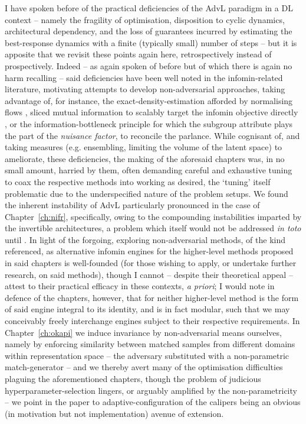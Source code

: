 %
I have spoken before of the practical deficiencies of the \ac{AdvL} paradigm in a \ac{DL} context
-- namely the fragility of optimisation, disposition to cyclic dynamics, architectural dependency,
and the loss of guarantees incurred by estimating the best-response dynamics with a finite
(typically small) number of steps -- but it is apposite that we revisit these points again here,
retrospectively instead of prospectively.
%
Indeed -- as again spoken of before but of which there is again no harm recalling -- said
deficiencies have been well noted in the infomin-related literature, motivating attempts to develop
non-adversarial approaches, taking advantage of, for instance, the exact-density-estimation
afforded by normalising flows \citep{balunovic2021fair}, sliced mutual information
\citep{goldfeld2021sliced} to scalably target the infomin objective directly
\citep{chen2022scalable}, or the information-bottleneck principle \citep{tishby2015deep,
moyer2018invariant} for which the subgroup attribute plays the part of the \emph{nuisance factor},
to reconcile the parlance.
%
While cognisant of, and taking measures (e.g. ensembling, limiting the volume of the latent space)
to ameliorate, these deficiencies, the making of the aforesaid chapters was, in no small amount,
harried by them, often demanding careful and exhaustive tuning to coax the respective methods into
working as desired, the `tuning' itself problematic due to the underspecified nature of the problem
setups.
%
We found the inherent instability of \ac{AdvL} particularly pronounced in the case of
Chapter~\ref{ch:nifr}, specifically, owing to the compounding instabilities imparted by the
invertible architectures, a problem which itself would not be addressed \emph{in toto} until
\cite{behrmann2021understanding}.
%
In light of the forgoing, exploring non-adversarial methods, of the kind referenced, as alternative
infomin engines for the higher-level methods proposed in said chapters is well-founded (for those
wishing to apply, or undertake further research, on said methods), though I cannot -- despite their
theoretical appeal -- attest to their practical efficacy in these contexts, \emph{a priori}; I
would note in defence of the chapters, however, that for neither higher-level method is the form of
said engine integral to its identity, and is in fact modular, such that we may conceivably freely
interchange engines subject to their respective requirements.
%
In Chapter~\ref{ch:okapi} we induce invariance by non-adversarial means ourselves, namely by
enforcing similarity between matched samples from different domains within representation space --
the adversary substituted with a non-parametric match-generator -- and we thereby avert many of the
optimisation difficulties plaguing the aforementioned chapters, though the problem of judicious
hyperparameter-selection lingers, or arguably amplified by the non-parametricity -- we point in the
paper to adaptive-configuration of the calipers being an obvious (in motivation but not
implementation) avenue of extension.
%

